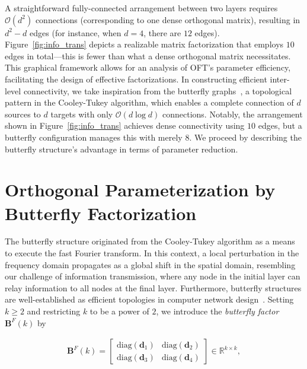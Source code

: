 A straightforward fully-connected arrangement between two layers requires $\mathcal{O}(d^2)$ connections (corresponding to one dense orthogonal matrix), resulting in $d^2 - d$ edges (for instance, when $d=4$, there are $12$ edges). Figure~\ref{fig:info_trans} depicts a realizable matrix factorization that employs $10$ edges in total—this is fewer than what a dense orthogonal matrix necessitates. This graphical framework allows for an analysis of OFT’s parameter efficiency, facilitating the design of effective factorizations. In constructing efficient inter-level connectivity, we take inspiration from the butterfly graphs~\cite{cooley1965algorithm}, a topological pattern in the Cooley-Tukey algorithm, which enables a complete connection of $d$ sources to $d$ targets with only $\mathcal{O}(d \log d)$ connections. Notably, the arrangement shown in Figure~\ref{fig:info_trans} achieves dense connectivity using $10$ edges, but a butterfly configuration manages this with merely $8$. We proceed by describing the butterfly structure’s advantage in terms of parameter reduction.

\section{Orthogonal Parameterization by Butterfly Factorization}

The butterfly structure originated from the Cooley-Tukey algorithm as a means to execute the fast Fourier transform. In this context, a local perturbation in the frequency domain propagates as a global shift in the spatial domain, resembling our challenge of information transmission, where any node in the initial layer can relay information to all nodes at the final layer. Furthermore, butterfly structures are well-established as efficient topologies in computer network design~\cite{solihin2015fundamentals,li2011linear}. Setting $k\geq 2$ and restricting $k$ to be a power of $2$, we introduce the \emph{butterfly factor} $\bm{B}^F(k)$ by

\begin{equation}\label{eq:but_factor}
\begin{aligned}
    \bm{B}^F(k)=\begin{bmatrix}
    \text{diag}(\bm{d}_1) & \text{diag}(\bm{d}_2) \\
    \text{diag}(\bm{d}_3) & \text{diag}(\bm{d}_4)
    \end{bmatrix}\in\mathbb{R}^{k\times k},
\end{aligned}
\end{equation}

